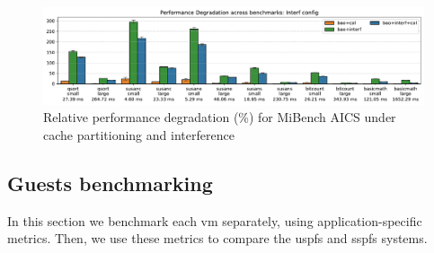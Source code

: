 \begin{figure}[!hbt]
  \centering
  \includegraphics[width=1.0\textwidth]{./img/pdf/plot-performDeg-Interf} 
  \caption{Relative performance degradation (\%) for MiBench AICS under cache partitioning and interference}%
  \label{fig:plot-performDeg-Interf}
\end{figure}



\subsection{Guests benchmarking}
\label{sec:guests-benchmarking}
In this section we benchmark each \gls{vm} separately, using
application-specific metrics. Then, we use these metrics to compare the
\gls{uspfs} and \gls{sspfs} systems.

